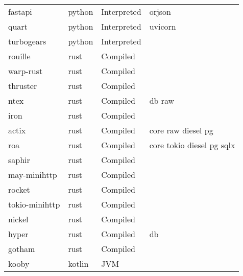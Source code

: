 \begin{longtable}{llll}
    fastapi          & python      & Interpreted & orjson                                             \\
    quart            & python      & Interpreted & uvicorn                                            \\
    turbogears       & python      & Interpreted &                                                    \\
    rouille          & rust        & Compiled    &                                                    \\
    warp-rust        & rust        & Compiled    &                                                    \\
    thruster         & rust        & Compiled    &                                                    \\
    ntex             & rust        & Compiled    & db raw                                             \\
    iron             & rust        & Compiled    &                                                    \\
    actix            & rust        & Compiled    & core raw diesel pg                                 \\
    roa              & rust        & Compiled    & core tokio diesel pg sqlx                          \\
    saphir           & rust        & Compiled    &                                                    \\
    may-minihttp     & rust        & Compiled    &                                                    \\
    rocket           & rust        & Compiled    &                                                    \\
    tokio-minihttp   & rust        & Compiled    &                                                    \\
    nickel           & rust        & Compiled    &                                                    \\
    hyper            & rust        & Compiled    & db                                                 \\
    gotham           & rust        & Compiled    &                                                    \\
    kooby            & kotlin      & JVM         &                                                    \\

\end{longtable}
